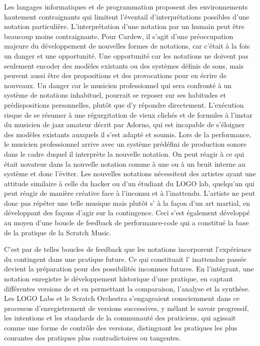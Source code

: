 {Les langages informatiques et de programmation proposent des
environnements hautement contraignants qui limitent l'\'eventail
d'interpr\'etations possibles d'une notation particuli\`ere.
L'interpr\'etation d'une notation par un humain peut \^etre beaucoup
moins contraignante. Pour Cardew, il s'agit d'une pr\'eoccupation
majeure du d\'eveloppement de nouvelles formes de notations, car
c'\'etait \`a la fois un danger et une opportunit\'e. Une opportunit\'e
car les notations ne doivent pas seulement encoder des mod\`eles
existants ou des syst\`emes d\'efinis de sons, mais peuvent aussi
\^etre des propositions et des provocations pour en \'ecrire de
nouveaux. Un danger car le musicien professionnel qui sera confront\'e
\`a un syst\`eme de notations inhabituel, pourrait se reposer sur ses
habitudes et pr\'edispositions personnelles, plut\^ot que d'y
r\'epondre directement. L'ex\'ecution risque de se r\'esumer \`a une
r\'egurgitation de vieux clich\'es et de formules \`a l'instar du
musicien de jazz amateur d\'ecrit par Adorno, qui est incapable de
s'\'eloigner des mod\`eles existants auxquels il s'est adapt\'e et
soumis. Lors de la performance, le musicien professionnel arrive avec
un syst\`eme pr\'ed\'efini de production sonore dans le cadre duquel il
interpr\`ete la nouvelle notation. On peut r\'eagir \`a ce qui \'etait
novateur dans la nouvelle notation comme \`a une  ou \`a un
bruit interne au syst\`eme et donc l'\'eviter. Les nouvelles notations
n\'ecessitent des artistes ayant une attitude similaire \`a celle du
hacker ou d'un \'etudiant du LOGO lab, quelqu'un qui
peut r\'eagir de mani\`ere cr\'eative face \`a l'inconnu et \`a
l'inattendu. L'artiste ne peut donc pas r\'ep\'eter une telle musique
mais plut\^ot s' \`a la fa\c{c}on d'un art martial, en
d\'eveloppant des fa\c{c}ons d'agir sur la contingence. Ceci s'est
\'egalement d\'evelopp\'e au moyen d'une boucle de feedback de
performance{}-code qui a constitu\'e la base de la pratique de la
Scratch Music. 

C'est par de telles boucles de feedback que les notations incorporent
l'exp\'erience du contingent dans une pratique future. Ce qui
constituait l' inattendue pass\'ee devient la pr\'eparation
pour des possibilit\'es inconnues futures. En l'int\'egrant, une
notation enregistre le d\'eveloppement historique d'une pratique, en
captant diff\'erentes versions de  et en permettant la
comparaison, l'analyse et la synth\`ese. Les LOGO Labs et le Scratch
Orchestra s'engageaient consciemment dans ce processus d'enregistrement
de versions successives, y m\^elant le savoir progressif, les
intentions et les standards de la communaut\'e des praticiens, qui
agissait comme une forme de contr\^ole des versions, distinguant les
pratiques les plus courantes des pratiques plus contradictoires ou
tangentes. 

}
